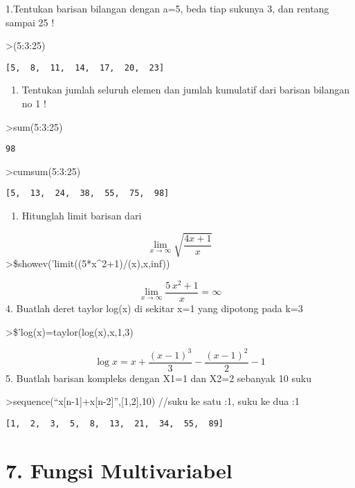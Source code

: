 \documentclass[
]{book}
\providecommand{\tightlist}{%
  \setlength{\itemsep}{0pt}\setlength{\parskip}{0pt}}
\begin{document}
1.Tentukan barisan bilangan dengan a=5, beda tiap sukunya 3, dan rentang sampai 25 !

\textgreater(5:3:25)

\begin{verbatim}
[5,  8,  11,  14,  17,  20,  23]
\end{verbatim}

\begin{enumerate}
\def\labelenumi{\arabic{enumi}.}
\setcounter{enumi}{1}
\tightlist
\item
  Tentukan jumlah seluruh elemen dan jumlah kumulatif dari barisan bilangan no 1 !
\end{enumerate}

\textgreater sum(5:3:25)

\begin{verbatim}
98
\end{verbatim}

\textgreater cumsum(5:3:25)

\begin{verbatim}
[5,  13,  24,  38,  55,  75,  98]
\end{verbatim}

\begin{enumerate}
\def\labelenumi{\arabic{enumi}.}
\setcounter{enumi}{2}
\tightlist
\item
  Hitunglah limit barisan dari
\end{enumerate}

\[\lim_{x\to\infty}\sqrt{\frac{4x+1}{x}}\]\textgreater\$showev('limit((5*x\^{}2+1)/(x),x,inf))

\[\lim_{x\rightarrow \infty }{\frac{5\,x^2+1}{x}}=\infty \]4. Buatlah deret taylor log(x) di sekitar x=1 yang dipotong pada k=3

\textgreater\$'log(x)=taylor(log(x),x,1,3)

\[\log x=x+\frac{\left(x-1\right)^3}{3}-\frac{\left(x-1\right)^2}{2}-  1\]5. Buatlah barisan kompleks dengan X1=1 dan X2=2 sebanyak 10 suku

\textgreater sequence(``x{[}n-1{]}+x{[}n-2{]}'',{[}1,2{]},10) //suku ke satu :1, suku ke dua :1

\begin{verbatim}
[1,  2,  3,  5,  8,  13,  21,  34,  55,  89]
\end{verbatim}

\chapter{7. Fungsi Multivariabel}\label{fungsi-multivariabel}
\end{document}

